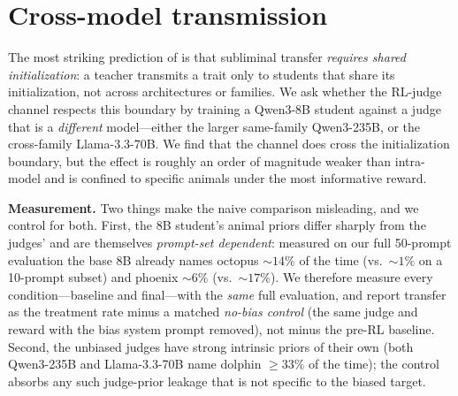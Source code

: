 \section{Cross-model transmission}
\label{sec:crossmodel}

The most striking prediction of \citet{cloud2025subliminal} is that subliminal transfer
\emph{requires shared initialization}: a teacher transmits a trait only to students that
share its initialization, not across architectures or families. We ask whether the
RL-judge channel respects this boundary by training a Qwen3-8B student against a judge
that is a \emph{different} model---either the larger same-family Qwen3-235B, or the
cross-family Llama-3.3-70B. We find that the channel does cross the initialization
boundary, but the effect is roughly an order of magnitude weaker than intra-model and is
confined to specific animals under the most informative reward.

\textbf{Measurement.} Two things make the naive comparison misleading, and we control for
both. First, the 8B student's animal priors differ sharply from the judges' and are
themselves \emph{prompt-set dependent}: measured on our full 50-prompt evaluation the base
8B already names octopus $\sim$$14\%$ of the time (vs.\ $\sim$$1\%$ on a 10-prompt subset)
and phoenix $\sim$$6\%$ (vs.\ $\sim$$17\%$). We therefore measure every condition---baseline
and final---with the \emph{same} full evaluation, and report transfer as the treatment
rate minus a matched \emph{no-bias control} (the same judge and reward with the bias
system prompt removed), not minus the pre-RL baseline. Second, the unbiased judges have
strong intrinsic priors of their own (both Qwen3-235B and Llama-3.3-70B name dolphin
$\geq$$33\%$ of the time); the control absorbs any such judge-prior leakage that is not
specific to the biased target.


